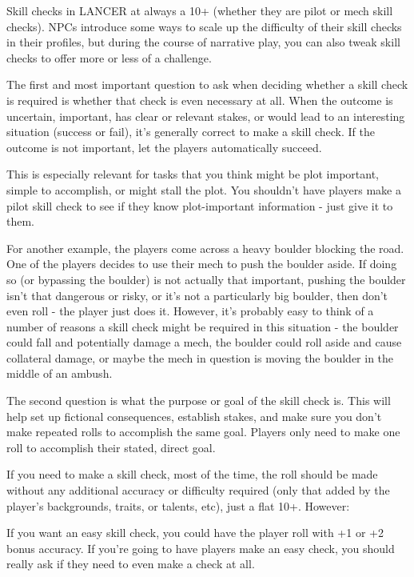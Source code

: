 Skill checks in LANCER at always a 10+ (whether they are pilot or mech skill checks). NPCs
introduce some ways to scale up the difficulty of their skill checks in their profiles, but during the
course of narrative play, you can also tweak skill checks to offer more or less of a challenge.


The first and most important question to ask when deciding whether a skill check is
required is whether that check is even necessary at all. When the outcome is uncertain,
important, has clear or relevant stakes, or would lead to an interesting situation (success or fail),
it’s generally correct to make a skill check. If the outcome is not important, let the players
automatically succeed.


This is especially relevant for tasks that you think might be plot important, simple to accomplish,
or might stall the plot. You shouldn’t have players make a pilot skill check to see if they know
plot-important information - just give it to them.


For another example, the players come across a heavy boulder blocking the road. One of the
players decides to use their mech to push the boulder aside. If doing so (or bypassing the
boulder) is not actually that important, pushing the boulder isn’t that dangerous or risky, or it’s
not a particularly big boulder, then don’t even roll - the player just does it. However, it’s probably
easy to think of a number of reasons a skill check might be required in this situation - the boulder
could fall and potentially damage a mech, the boulder could roll aside and cause collateral
damage, or maybe the mech in question is moving the boulder in the middle of an ambush.


The second question is what the purpose or goal of the skill check is. This will help set up
fictional consequences, establish stakes, and make sure you don’t make repeated rolls to
accomplish the same goal. Players only need to make one roll to accomplish their stated, direct
goal.


If you need to make a skill check, most of the time, the roll should be made without any
additional accuracy or difficulty required (only that added by the player’s backgrounds, traits, or
talents, etc), just a flat 10+. However:


If you want an easy skill check, you could have the player roll with +1 or +2 bonus accuracy. If
you’re going to have players make an easy check, you should really ask if they need to even
make a check at all.

